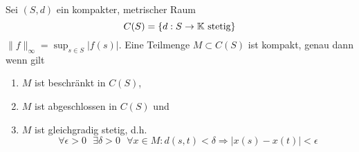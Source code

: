 \begin{satz} 
	Sei $(S, d)$ ein kompakter, metrischer Raum
	\[ C(S) = \{ d : S \rightarrow \mathbb{K} \text{ stetig} \} \]
	$\| f \|_{\infty} = \sup_{s \in S} | f(s) |$. Eine Teilmenge $M \subset C(S)$ ist kompakt, genau dann wenn gilt
		\begin{enumerate}[label=\alph*\upshape)]
			\item $M$ ist beschränkt in $C(S)$,
			\item $M$ ist abgeschlossen in $C(S)$ und
			\item $M$ ist gleichgradig stetig, d.h.
				\[ \forall \epsilon > 0 \text{ } \exists \delta > 0 \text{ } \forall x \in M: d(s, t) < \delta \Rightarrow | x(s) - x(t) | < \epsilon \]
		\end{enumerate}
\end{satz}
